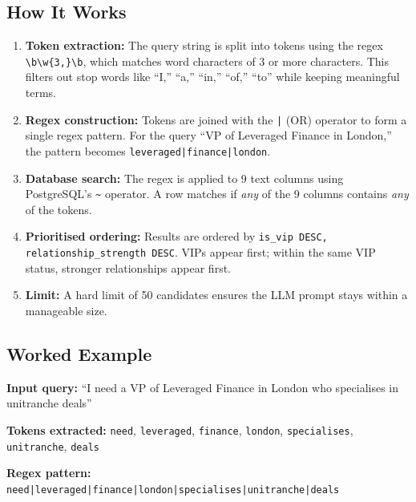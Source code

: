\documentclass[12pt, a4paper]{report}
\begin{document}
\subsection{How It Works}

\begin{enumerate}[itemsep=4pt]
    \item \textbf{Token extraction:} The query string is split into tokens using the regex \texttt{\textbackslash b\textbackslash w\{3,\}\textbackslash b}, which matches word characters of 3 or more characters. This filters out stop words like ``I,'' ``a,'' ``in,'' ``of,'' ``to'' while keeping meaningful terms.
    \item \textbf{Regex construction:} Tokens are joined with the \texttt{|} (OR) operator to form a single regex pattern. For the query ``VP of Leveraged Finance in London,'' the pattern becomes \texttt{leveraged|finance|london}.
    \item \textbf{Database search:} The regex is applied to 9 text columns using PostgreSQL's \texttt{\textasciitilde} operator. A row matches if \emph{any} of the 9 columns contains \emph{any} of the tokens.
    \item \textbf{Prioritised ordering:} Results are ordered by \texttt{is\_vip DESC, relationship\_strength DESC}. VIPs appear first; within the same VIP status, stronger relationships appear first.
    \item \textbf{Limit:} A hard limit of 50 candidates ensures the LLM prompt stays within a manageable size.
\end{enumerate}

\subsection{Worked Example}

\textbf{Input query:} ``I need a VP of Leveraged Finance in London who specialises in unitranche deals''

\textbf{Tokens extracted:} \texttt{need}, \texttt{leveraged}, \texttt{finance}, \texttt{london}, \texttt{specialises}, \texttt{unitranche}, \texttt{deals}

\textbf{Regex pattern:} \texttt{need|leveraged|finance|london|specialises|unitranche|deals}
\end{document}
